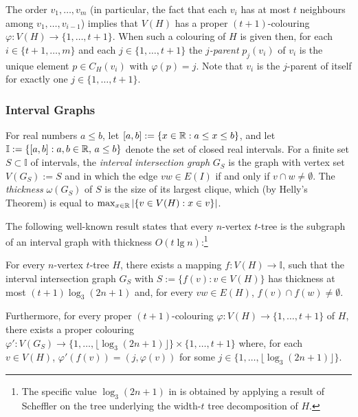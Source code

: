 \documentclass[kpfonts]{patmorin}
\begin{document}
The order $v_1,\ldots,v_m$ (in particular, the fact that each $v_i$ has at most $t$ neighbours among $v_1,\ldots,v_{i-1}$) implies that $V(H)$ has a proper $(t+1)$-colouring $\varphi:V(H)\to\{1,\ldots,t+1\}$.  When such a colouring of $H$ is given then, for each $i\in\{t+1,\ldots,m\}$ and each $j\in\{1,\ldots,t+1\}$ the \emph{$j$-parent} $p_j(v_i)$ of $v_i$ is the unique element $p\in C_H(v_i)$ with $\varphi(p)=j$.  Note that $v_i$ is the $j$-parent of itself for exactly one $j\in\{1,\ldots,t+1\}$.

\subsubsection{Interval Graphs}

For real numbers $a\le b$, let $[a,b]:=\{ x\in\mathbb{R}: a\le x\le b\}$, and let
$\mathbb{I}:=\{[a,b]: a,b\in\mathbb{R},\, a\le b\}$ denote the set of closed real intervals.  For a finite set $S\subset\mathbb{I}$ of intervals, the \emph{interval intersection graph} $G_S$ is the graph with vertex set $V(G_S):=S$ and in which the edge $vw\in E(I)$ if and only if $v\cap w\neq \emptyset$.  The \emph{thickness} $\omega(G_S)$ of $S$ is the size of its largest clique, which (by Helly's Theorem) is equal to $\max_{x\in\mathbb{R}}|\{v\in V(H):x\in v\}|$.  


The following well-known result states that every $n$-vertex $t$-tree is the subgraph of an interval graph with thickness $O(t\lg n)$:\footnote{The specific value $\log_3 (2n+1)$ in  is obtained by applying a result of Scheffler \cite{scheffler:optimal} on the tree underlying the width-$t$ tree decomposition of $H$.}

\begin{lem}
  For every $n$-vertex $t$-tree $H$, there exists a mapping $f:V(H)\to\mathbb{I}$, such that the interval intersection graph $G_S$ with $S:=\{f(v):v\in V(H)\}$ has thickness at most $(t+1)\log_3(2n+1)$ and, for every $vw\in E(H)$, $f(v)\cap f(w)\neq\emptyset$.  
  
  Furthermore, for every proper $(t+1)$-colouring $\varphi:V(H)\to\{1,\ldots,t+1\}$ of $H$, there exists a proper colouring $\varphi':V(G_S)\to\{1,\ldots,\lfloor\log_3(2n+1)\rfloor\}\times\{1,\ldots,t+1\}$ where, for each $v\in V(H)$, $\varphi'(f(v))=(j,\varphi(v))$ for some $j\in\{1,\ldots,\lfloor\log_3(2n+1)\rfloor\}$.
\end{lem}
\end{document}
